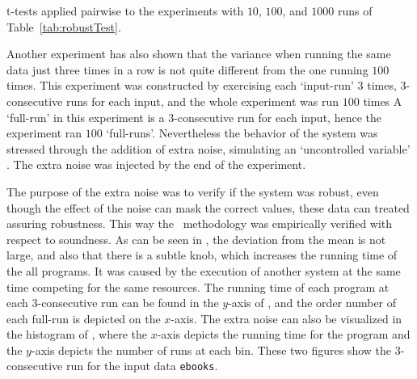 \begin{table}
  \centering
  \begin{tiny}
  
  \end{tiny}
  \caption{t-tests applied pairwise to the experiments with $10$, $100$, and $1000$ runs of Table~\ref{tab:robustTest}.}
  \label{tab:ttest}
\end{table}


Another experiment has also shown that the variance when running the same data just three times in a row is not quite different from the one running $100$ times. This experiment was constructed by exercising each `input-run' $3$ times, $3$-consecutive runs for each input, and the whole experiment was run $100$ times%
A `full-run' in this experiment is a $3$-consecutive run for each input, hence the experiment ran $100$ `full-runs'. Nevertheless the behavior of the system was stressed through the addition of extra noise, simulating an `uncontrolled variable' \cite{Kalibera2013}. The extra noise was injected by the end of the experiment.

The purpose of the extra noise was to verify if the system was robust, even though the effect of the noise can mask the correct values, these data can treated assuring robustness. This way the \CP\ methodology was empirically verified with respect to soundness. As can be seen in , the deviation from the mean is not large, and also that there is a subtle knob, which increases the running time of the all programs. It was caused by the execution of another system at the same time competing for the same resources. The running time of each program at each 3-consecutive run can be found in the $y$-axis of , and the order number of each full-run is depicted on the $x$-axis. The extra noise can also be visualized in the histogram of , where the $x$-axis depicts the running time for the program and the $y$-axis depicts the number of runs at each bin. These two figures show the $3$-consecutive run for the input data {\tt ebooks}.

